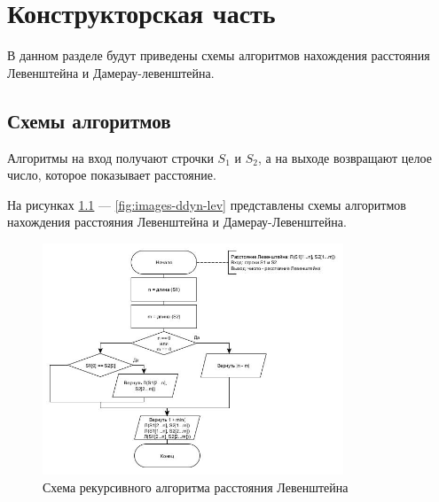 \chapter{Конструкторская часть}
В данном разделе будут приведены схемы алгоритмов нахождения расстояния Левенштейна и
Дамерау-левенштейна.

\section{Схемы алгоритмов}

Алгоритмы на вход получают строчки $S_1$ и $S_2$, а на выходе возвращают целое число,
которое показывает расстояние.

На рисунках \ref{fig:images-rec-lev} --- \ref{fig:images-ddyn-lev}
представлены схемы алгоритмов нахождения расстояния Левенштейна и Дамерау-Левенштейна.

\begin{figure}[h]
    \centering
    \includegraphics[width=0.8\textwidth]{images/lev_rec.jpg}
    \caption{Схема рекурсивного алгоритма расстояния Левенштейна}
    \label{fig:images-rec-lev}
\end{figure}

\clearpage


